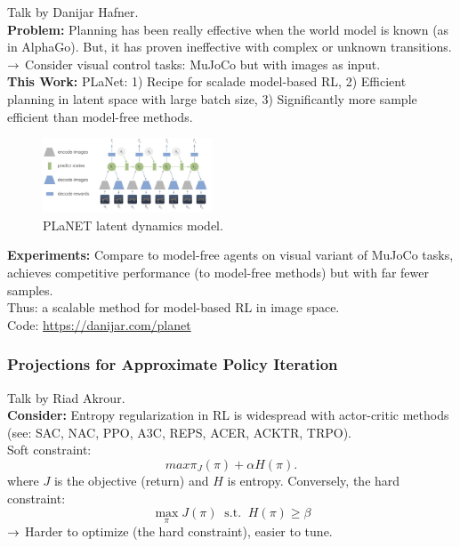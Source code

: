 Talk by Danijar Hafner. \\

{\bf Problem:} Planning has been really effective when the world model is known (as in AlphaGo). But, it has proven ineffective with complex or unknown transitions. \\

$\rightarrow$ Consider visual control tasks: MuJoCo but with images as input. \\

{\bf This Work:} PLaNet: 1) Recipe for scalade model-based RL, 2) Efficient planning in latent space with large batch size, 3) Significantly more sample efficient than model-free methods. \\

\begin{figure}
    \centering
    \includegraphics[width=0.45\textwidth]{images/planet.jpg}
    \caption{PLaNET latent dynamics model.}
    \label{fig:planet}
\end{figure}

{\bf Experiments:} Compare to model-free agents on visual variant of MuJoCo tasks, achieves competitive performance (to model-free methods) but with far fewer samples. \\

Thus: a scalable method for model-based RL in image space. \\

Code: \url{https://danijar.com/planet}

\spacerule

\subsubsection{Projections for Approximate Policy Iteration~\cite{akrour2019projections}}

Talk by Riad Akrour. \\

{\bf Consider:} Entropy regularization in RL is widespread with actor-critic methods (see: SAC, NAC, PPO, A3C, REPS, ACER, ACKTR, TRPO). \\

Soft constraint:
\[
max\pi_ J(\pi) + \alpha H(\pi).
\]
where $J$ is the objective (return) and $H$ is entropy. Conversely, the hard constraint:
\[
\max_\pi J(\pi)\ \text{ s.t. }\ H(\pi) \geq \beta
\]
$\rightarrow$ Harder to optimize (the hard constraint), easier to tune.

